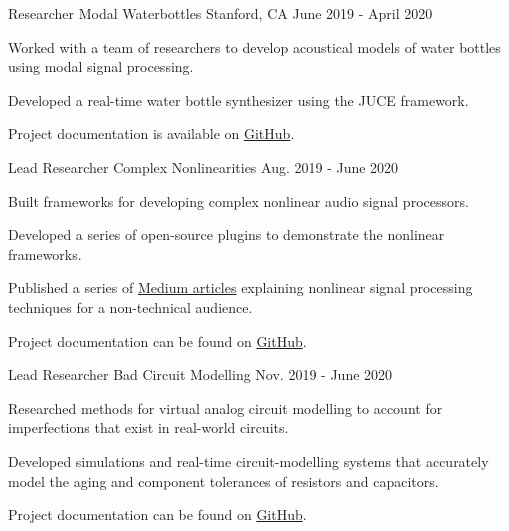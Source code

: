 \begin{cventries}
  \cventry
    {Researcher} %
    {Modal Waterbottles} %
    {Stanford, CA} %
    {June 2019 - April 2020} %
    {
      \begin{cvitems} %
        \item {Worked with a team of researchers to develop acoustical
               models of water bottles using modal signal processing.}
        \item {Developed a real-time water bottle synthesizer using the JUCE framework.}
        \item {Project documentation is available on \href{https://github.com/jatinchowdhury18/modal-waterbottles}{GitHub}.}
      \end{cvitems}
    }

  \cventry
    {Lead Researcher} %
    {Complex Nonlinearities} %
    {} %
    {Aug. 2019 - June 2020} %
    {
      \begin{cvitems} %
        \item {Built frameworks for developing complex nonlinear audio signal processors.}
        \item {Developed a series of open-source plugins to demonstrate the nonlinear frameworks.}
        \item {Published a series of \href{https://medium.com/@jatinchowdhury18/complex-nonlinearities-episode-0-why-4ad9b3eed60f}{Medium articles}
               explaining nonlinear signal processing techniques for a non-technical audience.}
        \item {Project documentation can be found on \href{https://github.com/jatinchowdhury18/ComplexNonlinearities}{GitHub}.}
      \end{cvitems}
    }

  \cventry
    {Lead Researcher} %
    {Bad Circuit Modelling} %
    {} %
    {Nov. 2019 - June 2020} %
    {
        \begin{cvitems}
              \item{Researched methods for virtual analog circuit modelling
                    to account for imperfections that exist in real-world circuits.}
              \item{Developed simulations and real-time circuit-modelling systems that
                    accurately model the aging and component tolerances of resistors and capacitors.}
              \item{Project documentation can be found on \href{https://github.com/jatinchowdhury18/Bad-Circuit-Modelling}{GitHub}.}
        \end{cvitems}
    }


\end{cventries}
